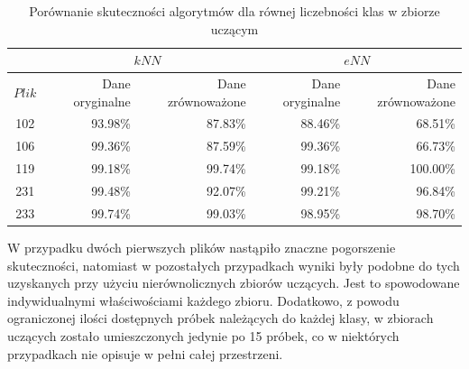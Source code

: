\begin{table}[H]
	\centering
	\begin{tabular}{|c|r|r|r|r|}
		\hline
		& \multicolumn{2}{c|}{$kNN$} & \multicolumn{2}{c|}{$eNN$} \\
		\hline
		$Plik$ & Dane oryginalne & Dane zrównoważone & Dane oryginalne & Dane zrównoważone \\
		\hline
		
		102 & 93.98\% & 87.83\% & 88.46\% & 68.51\% \\ 	
		\hline
		106 & 99.36\% & 87.59\% & 99.36\% & 66.73\% \\ 
		\hline	
		119 & 99.18\% & 99.74\% & 99.18\% & 100.00\% \\ 	
		\hline  
		231 & 99.48\% & 92.07\% & 99.21\% & 96.84\% \\ 	
		\hline                                   
		233 & 99.74\% & 99.03\% & 98.95\% & 98.70\% \\ 	
		\hline                                                                    
	\end{tabular}
	\caption{Porównanie skuteczności algorytmów dla równej liczebności klas w zbiorze uczącym}
	\label{tab:matlab-skutecznosc-rowno}
\end{table}

W przypadku dwóch pierwszych plików nastąpiło znaczne pogorszenie skuteczności, natomiast w pozostałych przypadkach wyniki były podobne do tych uzyskanych przy użyciu nierównolicznych zbiorów uczących. Jest to spowodowane indywidualnymi właściwościami każdego zbioru. Dodatkowo, z powodu ograniczonej ilości dostępnych próbek należących do każdej klasy, w zbiorach uczących zostało umieszczonych jedynie po 15 próbek, co w niektórych przypadkach nie opisuje w pełni całej przestrzeni. 



